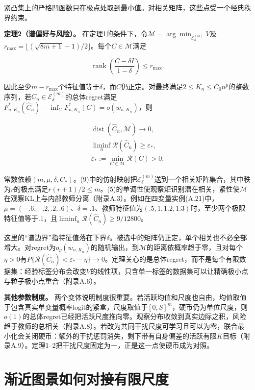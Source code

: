 \documentclass[11pt,a4paper]{article}
\begin{document}
紧凸集上的严格凹函数只在极点处取到最小值。对相关矩阵，这些点受一个经典秩界约束\citep{litam1994}。

\textbf{定理2（谱偏好与风险）。}
在定理1的条件下，令\(\mathcal M=\arg\min_{\mathcal E_\delta^{(m)}}V\)及\(r_{\max}=\lfloor(\sqrt{8m+1}-1)/2\rfloor\)。每个\(C\in\mathcal M\)满足

\[
\operatorname{rank}\left(\frac{C-\delta I}{1-\delta}\right)\le r_{\max}.
\tag{9}
\]

因此至少\(m-r_{\max}\)个特征值等于\(\delta\)，而\(C\)仍正定。对最终满足\(2\le K_n\le C_0n^p\)的整数序列，若\(\widehat C_n\in\mathcal E_\delta^{(m)}\)的总体regret满足\(F_{n,K_n}^*(\widehat C_n)-\inf_C F_{n,K_n}^*(C)=o(w_{n,K_n})\)，则

\[
\begin{gathered}
\operatorname{dist}(\widehat C_n,\mathcal M)\to0,\\
\liminf_n\mathcal R(\widehat C_n)
\ge\varepsilon_*,\\
\varepsilon_*:=\min_{C\in\mathcal M}\mathcal R(C)>0.
\end{gathered}
\tag{10}
\]

常数依赖\((m,\mu,\delta,C_*)\)。(9)中的仿射映射把\(\mathcal E_\delta^{(m)}\)送到一个相关矩阵集合，其中秩为\(r\)的极点满足\(r(r+1)/2\le m\)。(5)的单调性使观察矩识别潜在相关，紧性使\(\mathcal M\)在观察KL上与内部教师分离（附录A.3）。例如在四变量实例(A.21)中，\(\mu=(-.6,-.2,.2,.6)\)、\(\delta=.1\)、教师特征值为\((.5,1,1.2,1.3)\)时，至少两个极限特征值等于\(.1\)，且\(\liminf_n\mathcal R(\widehat C_n)\ge9/12800\)。

这里的``谱边界''指特征值落在下界\(\delta\)。被选中的矩阵仍正定，单个相关也不必全部增大。对regret为\(o_p(w_{n,K_n})\)的随机输出，到\(\mathcal M\)的距离依概率趋于零，且对每个\(\eta>0\)有\(P\{\mathcal R(\widehat C_n)<\varepsilon_*-\eta\}\to0\)。定理关心的是总体regret，而不是每个有限数据集：经验标签分布会改变\(V\)的线性项，只含单一标签的数据集可以让精确极小点与粒子极小点重合（附录A.6）。

\textbf{其他参数制度。}
两个变体说明制度很重要。若活跃均值和尺度也自由，均值取值于包含真实单变量概率logit的紧盒，尺度取值于\([0,S]^m\)，硬币仍为单位尺度，则\(o(1)\)的总体regret已经把活跃尺度推向零。观察分布收敛到真实边际之积，风险趋于教师的总相关（附录A.8）。若改为共同干扰尺度可学习且可以为零，联合最小化会关闭硬币：额外的干扰惩罚消失，剩下带有自身偏差的活跃有限\(K\)目标（附录A.9）。定理1--2把干扰尺度固定为一，正是这一点使硬币成为对照。

\section{渐近图景如何对接有限尺度}\label{ux6e10ux8fd1ux56feux666fux5982ux4f55ux5bf9ux63a5ux6709ux9650ux5c3aux5ea6}
\end{document}
